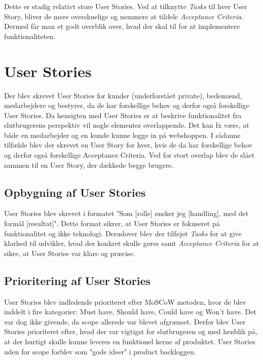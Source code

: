 Dette er stadig relativt store User Stories. Ved at tilknytte \emph{Tasks} til hver User Story, bliver de mere overskuelige og 
nemmere at tildele \emph{Acceptance Criteria}. Dermed får man et godt overblik over, hvad der skal til for at implementere funktionaliteten.

\section{User Stories}
Der blev skrevet User Stories for kunder (underforstået private), bedemænd, medarbejdere og bestyrer, da de har forskellige behov og derfor også forskellige User Stories.
Da hensigten med User Stories er at beskrive funktionalitet fra slutbrugerens perspektiv vil nogle elementer overlappende. Det kan fx være, at både en medarbejder og en kunde kunne logge in på webshoppen.
I sådanne tilfælde blev der skrevet en User Story for hver, hvis de da har forskellige behov og derfor også forskellige Acceptance Criteria.
Ved for stort overlap blev de slået sammen til en User Story, der dækkede begge brugere.

\subsection{Opbygning af User Stories}
User Stories blev skrevet i formatet "Som [rolle] ønsker jeg [handling], med det formål [resultat]".
Dette format sikrer, at User Stories er fokuseret på funktionalitet og ikke teknologi.
Derudover blev der tilføjet \emph{Tasks} for at give klarhed til udvikler, hvad der konkret skulle gøres samt \emph{Acceptance Criteria} for at sikre, at User Stories var klare og præcise.

\subsection{Prioritering af User Stories}
User Stories blev indledende prioriteret efter MoSCoW metoden, hvor de blev inddelt i fire kategorier: Must have, Should have, Could have og Won't have.
Det var dog ikke givende, da scope allerede var blevet afgrænset. Derfor blev User Stories prioriteret efter, hvad der var vigtigst for slutbrugeren og med henblik på, at der hurtigt skulle kunne leveres en funktionel kerne af produktet.
User Stories uden for scope forblev som "gode ideer" i product backloggen.

